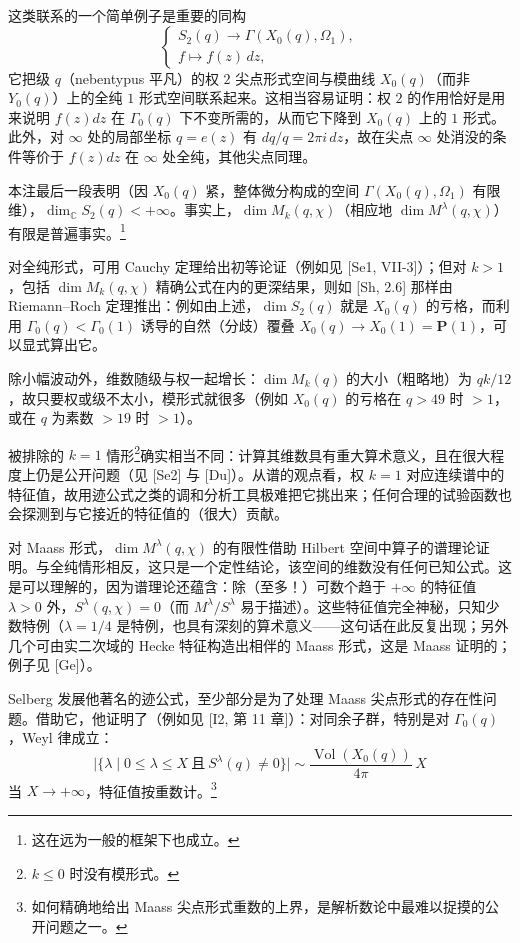 这类联系的一个简单例子是重要的同构
\[
\begin{cases}
S_{2}(q)\longrightarrow\Gamma(X_{0}(q),\Omega_{1}),\\
f\longmapsto f(z)\,dz,
\end{cases}
\]
它把级 $q$（nebentypus 平凡）的权 $2$ 尖点形式空间与模曲线 $X_{0}(q)$（而非 $Y_{0}(q)$）上的全纯 $1$ 形式空间联系起来。这相当容易证明：权 $2$ 的作用恰好是用来说明 $f(z)dz$ 在 $\Gamma_{0}(q)$ 下不变所需的，从而它下降到 $X_{0}(q)$ 上的 $1$ 形式。此外，对 $\infty$ 处的局部坐标 $q=e(z)$ 有 $dq/q=2\pi i\,dz$，故在尖点 $\infty$ 处消没的条件等价于 $f(z)dz$ 在 $\infty$ 处全纯，其他尖点同理。

本注最后一段表明（因 $X_{0}(q)$ 紧，整体微分构成的空间 $\Gamma(X_{0}(q),\Omega_{1})$ 有限维），$\dim_{\mathbb{C}}S_{2}(q)<+\infty$。事实上，$\dim M_{k}(q,\chi)$（相应地 $\dim M^{\lambda}(q,\chi)$）有限是普遍事实。\footnote{这在远为一般的框架下也成立。}

对全纯形式，可用 Cauchy 定理给出初等论证（例如见 [Se1, VII-3]）；但对 $k>1$，包括 $\dim M_{k}(q,\chi)$ 精确公式在内的更深结果，则如 [Sh, 2.6] 那样由 Riemann--Roch 定理推出：例如由上述，$\dim S_{2}(q)$ 就是 $X_{0}(q)$ 的亏格，而利用 $\Gamma_{0}(q)<\Gamma_{0}(1)$ 诱导的自然（分歧）覆叠 $X_{0}(q)\to X_{0}(1)=\mathbf{P}(1)$，可以显式算出它。

除小幅波动外，维数随级与权一起增长：$\dim M_{k}(q)$ 的大小（粗略地）为 $qk/12$，故只要权或级不太小，模形式就很多（例如 $X_{0}(q)$ 的亏格在 $q>49$ 时 $>1$，或在 $q$ 为素数 $>19$ 时 $>1$）。

被排除的 $k=1$ 情形\footnote{$k\le0$ 时没有模形式。}确实相当不同：计算其维数具有重大算术意义，且在很大程度上仍是公开问题（见 [Se2] 与 [Du]）。从谱的观点看，权 $k=1$ 对应连续谱中的特征值，故用迹公式之类的调和分析工具极难把它挑出来；任何合理的试验函数也会探测到与它接近的特征值的（很大）贡献。

对 Maass 形式，$\dim M^{\lambda}(q,\chi)$ 的有限性借助 Hilbert 空间中算子的谱理论证明。与全纯情形相反，这只是一个定性结论，该空间的维数没有任何已知公式。这是可以理解的，因为谱理论还蕴含：除（至多！）可数个趋于 $+\infty$ 的特征值 $\lambda>0$ 外，$S^{\lambda}(q,\chi)=0$（而 $M^{\lambda}/S^{\lambda}$ 易于描述）。这些特征值完全神秘，只知少数特例（$\lambda=1/4$ 是特例，也具有深刻的算术意义——这句话在此反复出现；另外几个可由实二次域的 Hecke 特征构造出相伴的 Maass 形式，这是 Maass 证明的；例子见 [Ge]）。

Selberg 发展他著名的迹公式，至少部分是为了处理 Maass 尖点形式的存在性问题。借助它，他证明了（例如见 [I2, 第 11 章]）：对同余子群，特别是对 $\Gamma_{0}(q)$，Weyl 律成立：
\[
\bigl|\{\lambda\mid0\le\lambda\le X\ \text{且}\ S^{\lambda}(q)\ne0\}\bigr|\sim\frac{\operatorname{Vol}(X_{0}(q))}{4\pi}\,X
\]
当 $X\to+\infty$，特征值按重数计。\footnote{如何精确地给出 Maass 尖点形式重数的上界，是解析数论中最难以捉摸的公开问题之一。}

